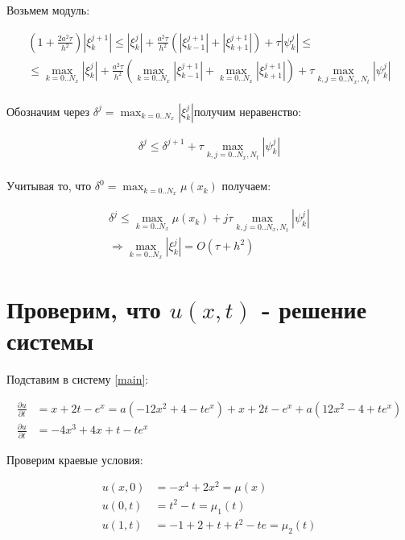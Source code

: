 \documentclass[12pt,a4paper]{scrartcl}
\begin{document}
Возьмем модуль:

\begin{align*}
    (1+ \frac{2 a^{2} \tau}{h^{2}})| \xi^{j+1}_{k}|  \le |\xi^{j}_{k}|+ \frac{a^{2} \tau}{h^{2}} (|\xi^{j+1}_{k-1}|+|\xi^{j+1}_{k+1}|) +\tau |\psi^{j}_k | \le\\
    \le \max_{k=0..N_{x}} |\xi^{j}_{k}|+ \frac{a^{2} \tau}{h^{2}} (\max_{k=0..N_{x}}|\xi^{j+1}_{k-1}|+\max_{k=0..N_{x}}|\xi^{j+1}_{k+1}|) +\tau \max_{k,j=0..N_{x},N_{t}}|\psi^{j}_k|\\
\end{align*}

Обозначим через $\delta^{j} = \max_{k=0..N_{x}} |\xi^{j}_{k}|$получим неравенство:

\begin{align*}
    \delta^{j} \le \delta^{j+1}+\tau \max_{k,j=0..N_{x},N_{t}}|\psi^{j}_k| \\
\end{align*}

Учитывая то, что $\delta^{0} = \max_{k=0..N_{x}} \mu(x_k)$ получаем:

\begin{align*}
    \delta^j \le \max_{k=0..N_{x}} \mu(x_k) + j \tau \max_{k,j=0..N_{x},N_{t}}|\psi^{j}_k| \\
    \Rightarrow \max_{k=0..N_{x}} |\xi^{j}_{k}| = O(\tau + h^{2})
\end{align*}

\section{Проверим, что $u(x,t)$ - решение системы}

Подставим в систему \eqref{main}:

\begin{align*}
    \frac{\partial u}{\partial t} &= x+ 2 t -e^{x} = a(-12 x^{2} + 4 - t e^{x}) + x+ 2 t - e^{x} + a(12 x^{2} - 4 +t e^{x}) \\
    \frac{\partial u}{\partial t} &= -4 x^{3} +4 x+t-t e^{x} 
\end{align*}

Проверим краевые условия:

\begin{align*}
    u(x,0) &= - x^{4}+2 x^{2} = \mu(x) \\
    u(0,t) &= t^{2}-t = \mu_1(t) \\
    u(1,t) &= -1+2+t+t^{2}-t e = \mu_2(t) \\
\end{align*}
\end{document}
